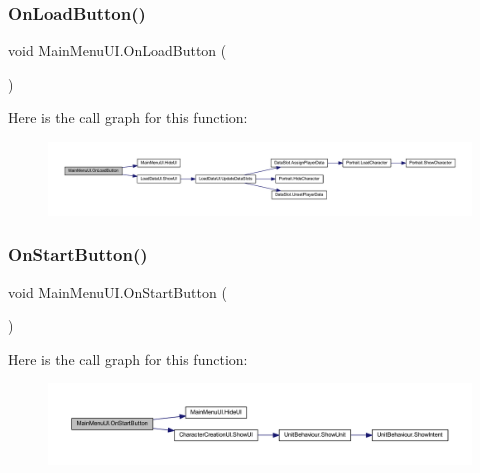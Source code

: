 \subsubsection{\texorpdfstring{OnLoadButton()}{OnLoadButton()}}
{\footnotesize\ttfamily void Main\+Menu\+U\+I.\+On\+Load\+Button (\begin{DoxyParamCaption}{ }\end{DoxyParamCaption})}

Here is the call graph for this function\+:
\nopagebreak
\begin{figure}[H]
\begin{center}
\leavevmode
\includegraphics[width=350pt]{class_main_menu_u_i_ab97fc6c28c9bfe985c650c7572aec0fc_cgraph}
\end{center}
\end{figure}
\mbox{\label{class_main_menu_u_i_ac567ba394028f00989750f4782325daf}} 
\subsubsection{\texorpdfstring{OnStartButton()}{OnStartButton()}}
{\footnotesize\ttfamily void Main\+Menu\+U\+I.\+On\+Start\+Button (\begin{DoxyParamCaption}{ }\end{DoxyParamCaption})}

Here is the call graph for this function\+:
\nopagebreak
\begin{figure}[H]
\begin{center}
\leavevmode
\includegraphics[width=350pt]{class_main_menu_u_i_ac567ba394028f00989750f4782325daf_cgraph}
\end{center}
\end{figure}
\mbox{\label{class_main_menu_u_i_ab70d817a22e65d2258cfd0d9a48404a8}} 
